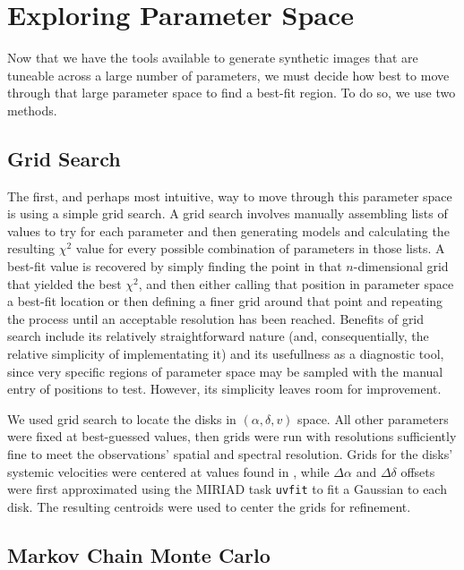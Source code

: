 \section{Exploring Parameter Space}
\label{section:param_space}

Now that we have the tools available to generate synthetic images that are tuneable across a large number of parameters, we must decide how best to move through that large parameter space to find a best-fit region. To do so, we use two methods.

\subsection{Grid Search}
\label{subsection:grid_search}
The first, and perhaps most intuitive, way to move through this parameter space is using a simple grid search. A grid search involves manually assembling lists of values to try for each parameter and then generating models and calculating the resulting $\chi^2$ value for every possible combination of parameters in those lists. A best-fit value is recovered by simply finding the point in that $n$-dimensional grid that yielded the best $\chi^2$, and then either calling that position in parameter space a best-fit location or then defining a finer grid around that point and repeating the process until an acceptable resolution has been reached. Benefits of grid search include its relatively straightforward nature (and, consequentially, the relative simplicity of implementating it) and its usefullness as a diagnostic tool, since very specific regions of parameter space may be sampled with the manual entry of positions to test. However, its simplicity leaves room for improvement.

We used grid search to locate the disks in $(\alpha, \delta, v)$ space. All other parameters were fixed at best-guessed values, then grids were run with resolutions sufficiently fine to meet the observations' spatial and spectral resolution. Grids for the disks' systemic velocities were centered at values found in \citet{Williams2014}, while $\Delta \alpha$ and $\Delta \delta$ offsets were first approximated using the MIRIAD task \texttt{uvfit} to fit a Gaussian to each disk. The resulting centroids were used to center the grids for refinement.


\subsection{Markov Chain Monte Carlo}
\label{subsection:mcmc}

